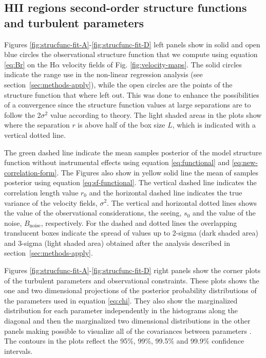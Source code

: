 \documentclass[fleqn,usenatbib, useAMS, a4paper]{mnras}
\newcommand\ha{\ensuremath{\text{H}\alpha}}
\begin{document}
\subsection{HII regions second-order structure functions and turbulent parameters}

Figures \ref{fig:strucfunc-fit-A}-\ref{fig:strucfunc-fit-D} left panels show in solid and open blue circles the observational structure function that we compute using equation \ref{eq:Br} on the \ha{} velocity fields of Fig. \ref{fig:velocity-maps}. The solid circles indicate the range use in the non-linear regression analysis (see section~\ref{sec:methods-apply}), while the open circles are the points of the structure function that where left out.
This was done to enhance the possibilities of a convergence since the structure function values at large separations are to follow the 2\(\sigma^2\) value according to theory.
The light shaded areas in the plots show where the separation \(r\) is above half of the box size \(L\), which is indicated with a vertical dotted line.

The green dashed line indicate the mean samples posterior of the model structure function without instrumental effects using equation \ref{eq:functional} and \ref{eq:new-correlation-form}.
The Figures also show in yellow solid line the mean of samples posterior using equation \ref{eq:sf-functional}.
The vertical dashed line indicates the correlation length value \(r_0\) and the horizontal dashed line indicates the true variance of the velocity fields, \(\sigma^2\).
The vertical and horizontal dotted lines shows the value of the observational considerations, the seeing, \(s_0\) and the value of the noise, \(B_{\text{noise}}\), respectively.
For the dashed and dotted lines the overlapping translucent boxes indicate the spread of values up to 2-sigma (dark shaded area) and 3-sigma (light shaded area) obtained after the analysis described in section~\ref{sec:methods-apply}.

Figures \ref{fig:strucfunc-fit-A}-\ref{fig:strucfunc-fit-D} right panels show the corner plots \citep{2017ascl.soft02002F} of the turbulent parameters and observational constraints. 
These plots shows the one and two dimensional projections of the posterior probability distributions of the parameters used in equation \ref{eq:chi}.
They also show the marginalized distribution for each parameter independently in the histograms along the diagonal and then the marginalized two dimensional distributions in the other panels making possible to visualize all of the covariances between parameters \citep{2017ascl.soft02002F}.
The contours in the plots reflect the 95\(\%\), 99\(\%\), 99.5\(\%\) and 99.9\(\%\) confidence intervals.
\end{document}
